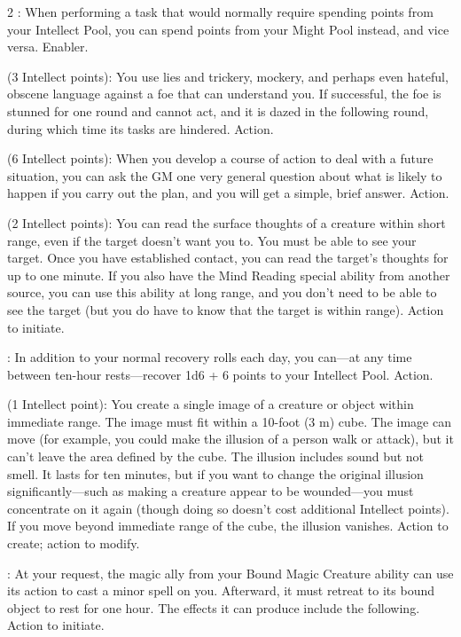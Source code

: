 \begin{multicols}{2}
: When performing a task that would normally require spending points from your Intellect Pool, you can spend points from your Might Pool instead, and vice versa. Enabler. 
 
 (3 Intellect points): You use lies and trickery, mockery, and perhaps even hateful, obscene language against a foe that can understand you. If successful, the foe is stunned for one round and cannot act, and it is dazed in the following round, during which time its tasks are hindered. Action. 
 
 (6 Intellect points): When you develop a course of action to deal with a future situation, you can ask the GM one very general question about what is likely to happen if you carry out the plan, and you will get a simple, brief answer. Action. 
 
 (2 Intellect points): You can read the surface thoughts of a creature within short range, even if the target doesn’t want you to. You must be able to see your target. Once you have established contact, you can read the target’s thoughts for up to one minute. If you also have the Mind Reading special ability from another source, you can use this ability at long range, and you don’t need to be able to see the target (but you do have to know that the target is within range). Action to initiate. 
 
: In addition to your normal recovery rolls each day, you can—at any time between ten-hour rests—recover 1d6 + 6 points to your Intellect Pool. Action.
 
 (1 Intellect point): You create a single image of a creature or object within immediate range. The image must fit within a 10-foot (3 m)
cube. The image can move (for example, you could make the illusion of a person walk or attack), but it can’t leave the area defined by the cube. The illusion includes sound but not smell. It lasts for ten minutes, but if you want to change the original illusion significantly—such as making a creature appear to be wounded—you must concentrate on it again (though doing so doesn’t cost additional Intellect points). If you move beyond immediate range of the cube, the illusion vanishes. Action to create; action to modify. 
 
: At your request, the magic ally from your Bound Magic Creature ability can use its action to cast a minor spell on you. Afterward, it must retreat to its bound object to rest for one hour. The effects it can produce include the following. Action to initiate. 


\end{multicols}
